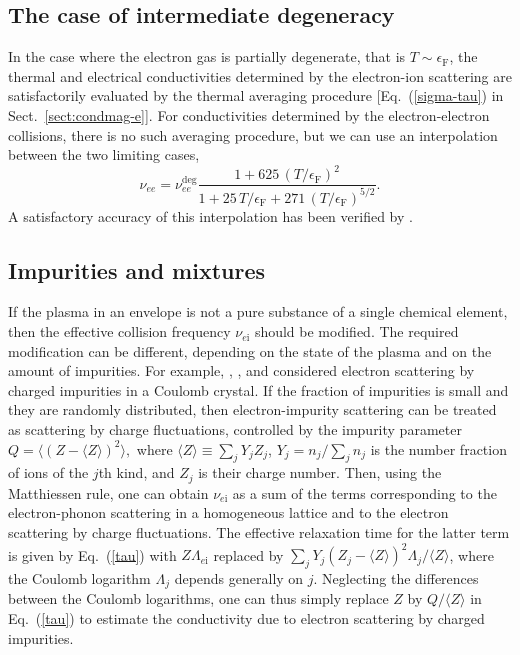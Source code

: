 \documentclass[smallextended]{svjour3}       %
\newcommand{\beq}{\begin{equation}}
\newcommand{\eeq}{\end{equation}}
\newcommand{\EF}{\epsilon_\mathrm{F}}
\newcommand{\req}[1]{Eq.~(\ref{#1})}
\begin{document}
\begin{appendix}
\subsection{The case of intermediate degeneracy}
\label{sect:interpolate}

In the case where the electron gas is partially degenerate,
that is $T\sim\EF$, the thermal and electrical
conductivities determined by the electron-ion scattering are
satisfactorily evaluated by the thermal averaging procedure
[\req{sigma-tau} in Sect.~\ref{sect:condmag-e}]. For conductivities
determined by the electron-electron collisions, there is no
such averaging procedure, but we can use an
interpolation between the two limiting cases,
\beq
 \nu_{ee} = \nu_{ee}^{\mathrm{deg}}
    \frac{1+625\, (T/\EF)^2}{1+25\, T/\EF+ 271\, (T/\EF)^{5/2}}.
\label{nu-ee}
\eeq
A satisfactory accuracy of this interpolation has been
verified by \citet{Cassisi-ea07}.

\subsection{Impurities and mixtures}
\label{sect:imp}

If the plasma in an envelope is not a pure substance of a single
chemical element,
then the
effective collision frequency $\nu_{e\mathrm{i}}$ should 
be modified. The required modification can be different,
depending on the state of the plasma and on the amount of
impurities. For example, \citet{FlowersItoh76},
\citet{YakovlevUrpin80}, and
\citet{ItohKohyama93} considered electron scattering by charged
impurities in a Coulomb crystal. If the fraction of
impurities is small and they are randomly distributed, then
electron-impurity scattering can be treated as scattering by
charge fluctuations, controlled by the impurity parameter
$
Q = \langle (Z-\langle Z\rangle)^2\rangle,
$
where $\langle Z\rangle \equiv \sum_j Y_j Z_j$,
$Y_j=n_j/\sum_j n_j$ is the number fraction of ions of the
$j$th kind, and $Z_j$ is their charge number. Then, using
the Matthiessen rule, one can obtain  $\nu_{e\mathrm{i}}$ as
a sum of the terms corresponding to the electron-phonon
scattering in a homogeneous lattice and to the electron
scattering by charge fluctuations. The effective relaxation
time for the latter term is given by \req{tau} with
$Z\Lambda_{e\mathrm{i}}$ replaced by $\sum_j Y_j(Z_j-\langle
Z\rangle)^2 \Lambda_j/\langle Z\rangle$, where the Coulomb
logarithm $\Lambda_j$ depends generally on $j$. Neglecting the
differences between the Coulomb logarithms, one can thus simply
replace $Z$ by $Q/\langle Z\rangle$ in \req{tau} to estimate
the conductivity due to electron scattering by charged
impurities.


\end{appendix}
\end{document}
